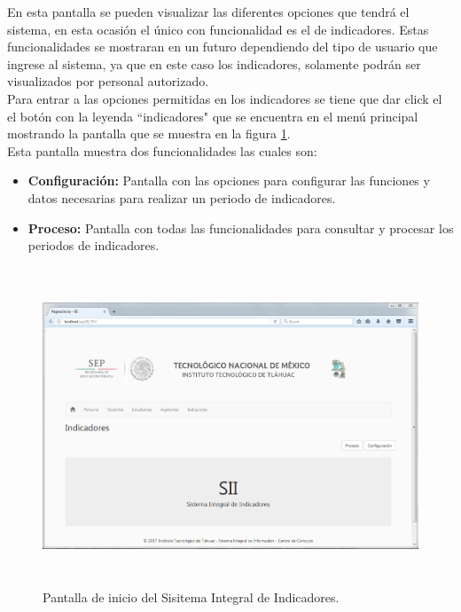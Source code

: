 	    En esta pantalla se pueden visualizar las diferentes opciones que tendr\'a el sistema, en esta ocasi\'on el \'unico con funcionalidad es el de indicadores. Estas funcionalidades se mostraran en un futuro dependiendo del tipo de usuario que ingrese al sistema, ya que en este caso los indicadores, solamente podr\'an ser visualizados por personal autorizado.\\

	    Para entrar a las opciones permitidas en los indicadores se tiene que dar click el el bot\'on con la leyenda ``indicadores" que se encuentra en el men\'u principal mostrando la pantalla que se muestra en la figura \ref{fig_principali}.\\

	    Esta pantalla muestra dos funcionalidades las cuales son:
	    \begin{itemize}
	    	\item \textbf{Configuraci\'on:} Pantalla con las opciones para configurar las funciones y datos necesarias para realizar un periodo de indicadores.
	    	\item \textbf{Proceso:} Pantalla con todas las funcionalidades para consultar y procesar los periodos de indicadores.
	    \end{itemize}


	    \begin{figure}[]
	        \centering
	        \includegraphics[width=16cm, height=9.5cm]{figuras/principali}
	        \caption{Pantalla de inicio del Sisitema Integral de Indicadores.}
	        \label{fig_principali}
	    \end{figure}

